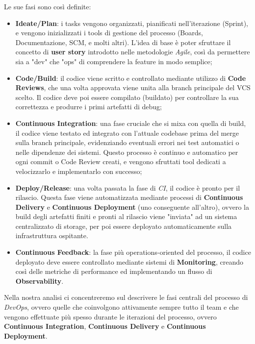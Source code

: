 \documentclass[a4paper,12pt]{report}
\begin{document}
				Le sue fasi sono così definite:
				\begin{itemize}
					\item \textbf{Ideate/Plan}: i tasks vengono organizzati, pianificati nell'iterazione (Sprint), e vengono inizializzati i tools di gestione del processo (Boards, Documentazione, SCM, e molti altri). L'idea di base è poter sfruttare il concetto di \textbf{user story} introdotto nelle metodologie \emph{Agile}, così da permettere sia a "dev" che "ops" di comprendere la feature in modo semplice;
					\item \textbf{Code/Build}: il codice viene scritto e controllato mediante utilizzo di \textbf{Code Reviews}, che una volta approvata viene unita alla branch principale del VCS scelto. Il codice deve poi essere compilato (buildato) per controllare la sua correttezza e produrre i primi artefatti di debug;
					\item \textbf{Continuous Integration}: una fase cruciale che si mixa con quella di build, il codice viene testato ed integrato con l'attuale codebase prima del merge sulla branch principale, evidenziando eventuali errori nei test automatici o nelle dipendenze dei sistemi. Questo processo è continuo e automatico per ogni commit o Code Review creati, e vengono sfruttati tool dedicati a velocizzarlo e implementarlo con successo;
					\item \textbf{Deploy/Release}: una volta passata la fase di \emph{CI}, il codice è pronto per il rilascio. Questa fase viene automatizzata mediante processi di \textbf{Continuous Delivery} e \textbf{Continuous Deployment} (uno conseguente all'altro), ovvero la build degli artefatti finiti e pronti al rilascio viene "inviata" ad un sistema centralizzato di storage, per poi essere deployato automaticamente sulla infrastruttura ospitante.
					\item \textbf{Continuous Feedback}: la fase più operations-oriented del processo, il codice deployato deve essere controllato mediante sistemi di \textbf{Monitoring}, creando così delle metriche di performance ed implementando un flusso di \textbf{Observability}.
				\end{itemize}
				
				Nella nostra analisi ci concentreremo sul descrivere le fasi centrali del processo di \emph{DevOps}, ovvero quelle che coinvolgono attivamente sempre tutto il team e che vengono effettuate più spesso durante le iterazioni del processo, ovvero \textbf{Continuous Integration}, \textbf{Continuous Delivery} e \textbf{Continuous Deployment}.
				
\end{document}
